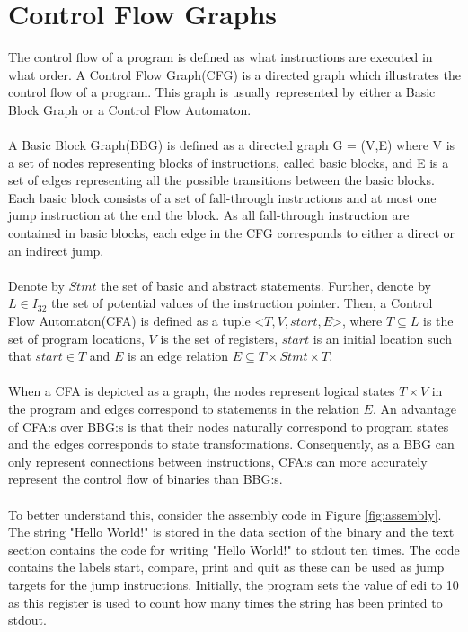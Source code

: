 \documentclass{kththesis}
\begin{document}
\section{Control Flow Graphs}
The control flow of a program is defined as what instructions are executed in what order. A Control Flow Graph(CFG) is a directed graph which illustrates the control flow of a program. This graph is usually represented by either a Basic Block Graph or a Control Flow Automaton.
\\ \\
A Basic Block Graph(BBG) is defined as a directed graph G = (V,E) where V is a set of nodes representing blocks of instructions, called basic blocks, and E is a set of edges representing all the possible transitions between the basic blocks. Each basic block consists of a set of fall-through instructions and at most one jump instruction at the end the block. As all fall-through instruction are contained in basic blocks, each edge in the CFG corresponds to either a direct or an indirect jump.
\\ \\ 
Denote by $Stmt$ the set of basic and abstract statements. Further, denote by $L \in I_{32}$ the set of potential values of the instruction pointer. Then, a Control Flow Automaton(CFA) is defined as a tuple <$T,V,start,E$>, where $T \subseteq L$ is the set of program locations, $V$ is the set of registers, $start$ is an initial location such that $start \in T$ and $E$ is an edge relation $E \subseteq T \times Stmt \times T$. 
\\ \\
When a CFA is depicted as a graph, the nodes represent logical states $T \times V$ in the program and edges correspond to statements in the relation $E$. An advantage of CFA:s over BBG:s is that their nodes naturally correspond to program states and the edges corresponds to state transformations\cite{Jakstab}. Consequently, as a BBG can only represent connections between instructions, CFA:s can more accurately represent the control flow of binaries than BBG:s. 
\\ \\
To better understand this, consider the assembly code in Figure \ref{fig:assembly}. The string "Hello World!" is stored in the data section of the binary and the text section contains the code for writing "Hello World!" to stdout ten times. The code contains the labels start, compare, print and quit as these can be used as jump targets for the jump instructions. Initially, the program sets the value of edi to 10 as this register is used to count how many times the string has been printed to stdout.
\end{document}
